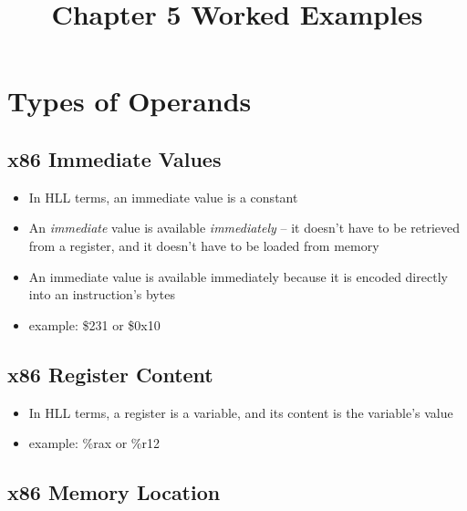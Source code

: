\documentclass{article}
\begin{document}
\title{Chapter 5 Worked Examples}
\date{}
\maketitle


\section{Types of Operands}

\subsection{x86 Immediate Values}

\begin{itemize}
\item In HLL terms, an immediate value is a constant
\item An \textit{immediate} value is available \textit{immediately} -- it doesn't have to be retrieved from a register, and it doesn't have to be loaded from memory
\item An immediate value is available immediately because it is encoded directly into an instruction's bytes
\item example: \$231 or \$0x10
\end{itemize}

\subsection{x86 Register Content}

\begin{itemize}
\item In HLL terms, a register is a variable, and its content is the variable's value
\item example: \%rax or \%r12
\end{itemize}

\subsection{x86 Memory Location}
\end{document}
